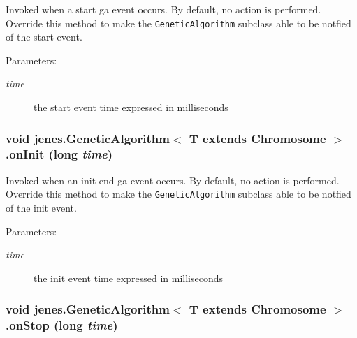Invoked when a start ga event occurs. By default, no action is performed. Override this method to make the {\tt GeneticAlgorithm} subclass able to be notfied of the start event.

\begin{Desc}
\item[Parameters:]
\begin{description}
\item[{\em time}]the start event time expressed in milliseconds \end{description}
\end{Desc}
\hypertarget{classjenes_1_1_genetic_algorithm_3_01_t_01extends_01_chromosome_01_4_85479397ce0f8bd995b97fa91f4d6690}{
\subsubsection[onInit]{\setlength{\rightskip}{0pt plus 5cm}void jenes.GeneticAlgorithm$<$ T extends Chromosome $>$.onInit (long {\em time})}}
\label{classjenes_1_1_genetic_algorithm_3_01_t_01extends_01_chromosome_01_4_85479397ce0f8bd995b97fa91f4d6690}


Invoked when an init end ga event occurs. By default, no action is performed. Override this method to make the {\tt GeneticAlgorithm} subclass able to be notfied of the init event.

\begin{Desc}
\item[Parameters:]
\begin{description}
\item[{\em time}]the init event time expressed in milliseconds \end{description}
\end{Desc}
\hypertarget{classjenes_1_1_genetic_algorithm_3_01_t_01extends_01_chromosome_01_4_04258af6f64ec98561b015651d20f9ea}{
\subsubsection[onStop]{\setlength{\rightskip}{0pt plus 5cm}void jenes.GeneticAlgorithm$<$ T extends Chromosome $>$.onStop (long {\em time})}}
\label{classjenes_1_1_genetic_algorithm_3_01_t_01extends_01_chromosome_01_4_04258af6f64ec98561b015651d20f9ea}


